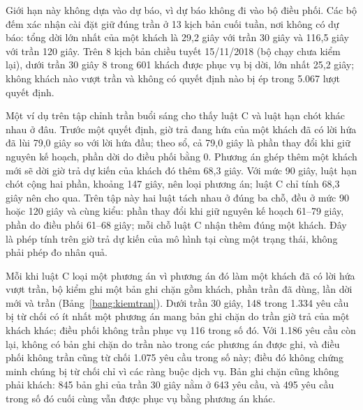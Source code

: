 Giới hạn này không dựa vào dự báo, vì dự báo không đi vào bộ điều phối. Các bộ đếm xác nhận cài đặt giữ đúng trần ở
13 kịch bản cuối tuần, nơi không có dự báo: tổng dời lớn nhất của một khách là 29,2 giây với trần 30 giây và 116,5
giây với trần 120 giây. Trên 8 kịch bản chiều tuyết 15/11/2018 (bộ chạy chưa kiểm lại), dưới trần 30 giây 8 trong 601
khách được phục vụ bị dời, lớn nhất 25,2 giây; không khách nào vượt trần và không có quyết định nào bị ép trong 5.067
lượt quyết định.

Một ví dụ trên tập chỉnh trần buổi sáng cho thấy luật C và luật hạn chót khác nhau ở đâu. Trước một quyết định, giờ
trả đang hứa của một khách đã có lời hứa đã lùi 79,0 giây so với lời hứa đầu; theo sổ, cả 79,0 giây là phần thay đổi
khi giữ nguyên kế hoạch, phần dời do điều phối bằng 0. Phương án ghép thêm một khách mới sẽ dời giờ trả dự kiến của
khách đó thêm 68,3 giây. Với mức 90 giây, luật hạn chót cộng hai phần, khoảng 147 giây, nên loại phương án; luật C
chỉ tính 68,3 giây nên cho qua. Trên tập này hai luật tách nhau ở đúng ba chỗ, đều ở mức 90 hoặc 120 giây và cùng
kiểu: phần thay đổi khi giữ nguyên kế hoạch 61--79 giây, phần do điều phối 61--68 giây; mỗi chỗ luật C nhận thêm đúng
một khách. Đây là phép tính trên giờ trả dự kiến của mô hình tại cùng một trạng thái, không phải phép đo nhân quả.

Mỗi khi luật C loại một phương án vì phương án đó làm một khách đã có lời hứa vượt trần, bộ kiểm ghi một bản ghi chặn
gồm khách, phần trần đã dùng, lần dời mới và trần (Bảng~\ref{bang:kiemtran}). Dưới trần 30 giây, 148 trong 1.334
yêu cầu bị từ chối có ít nhất một phương án mang bản ghi chặn do trần giờ trả của một khách khác; điều phối không trần
phục vụ 116 trong số đó. Với 1.186 yêu cầu còn lại, không có bản ghi chặn do trần nào trong các phương án được ghi, và
điều phối không trần cũng từ chối 1.075 yêu cầu trong số này; điều đó không chứng minh chúng bị từ chối chỉ vì các
ràng buộc dịch vụ. Bản ghi chặn cũng không phải khách: 845 bản ghi của trần 30 giây nằm ở 643 yêu cầu, và 495 yêu cầu
trong số đó cuối cùng vẫn được phục vụ bằng phương án khác.


